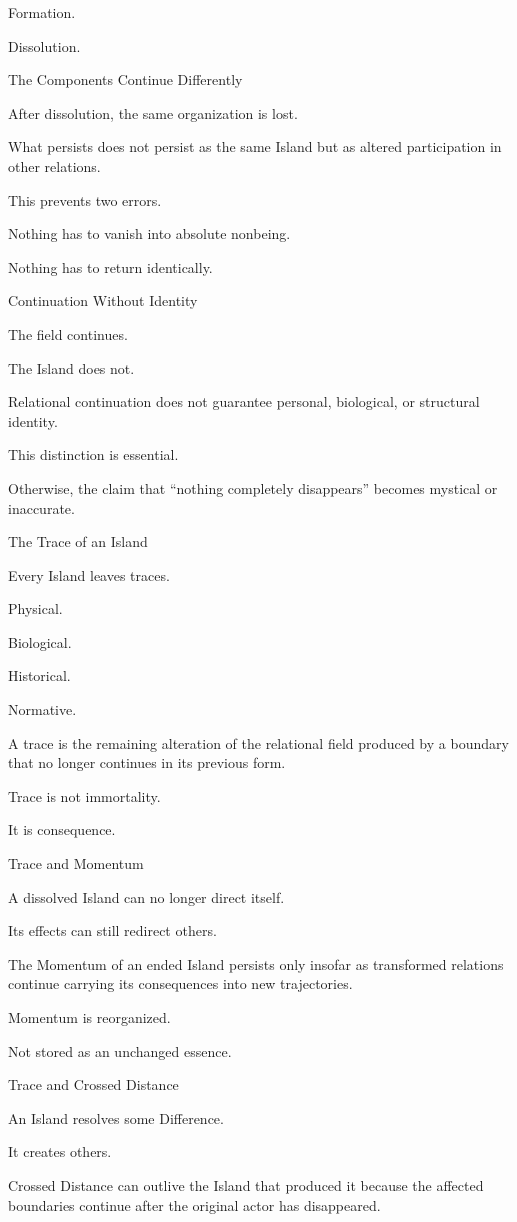 Formation.

Dissolution.

The Components Continue Differently

After dissolution, the same organization is lost.

What persists does not persist as the same Island but as altered participation in other relations.

This prevents two errors.

Nothing has to vanish into absolute nonbeing.

Nothing has to return identically.

Continuation Without Identity

The field continues.

The Island does not.

Relational continuation does not guarantee personal, biological, or structural identity.

This distinction is essential.

Otherwise, the claim that “nothing completely disappears” becomes mystical or inaccurate.

The Trace of an Island

Every Island leaves traces.

Physical.

Biological.

Historical.

Normative.

A trace is the remaining alteration of the relational field produced by a boundary that no longer continues in its previous form.

Trace is not immortality.

It is consequence.

Trace and Momentum

A dissolved Island can no longer direct itself.

Its effects can still redirect others.

The Momentum of an ended Island persists only insofar as transformed relations continue carrying its consequences into new trajectories.

Momentum is reorganized.

Not stored as an unchanged essence.

Trace and Crossed Distance

An Island resolves some Difference.

It creates others.

Crossed Distance can outlive the Island that produced it because the affected boundaries continue after the original actor has disappeared.

